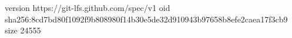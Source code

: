 version https://git-lfs.github.com/spec/v1
oid sha256:8cd7bd80f1092f9b808980f14b30e5de32d910943b97658b8efe2caea17f3cb9
size 24555
